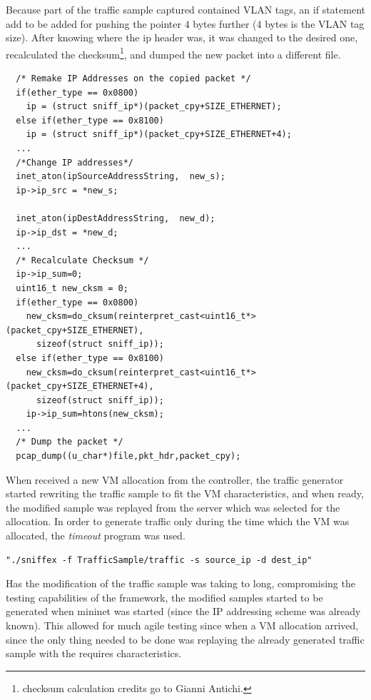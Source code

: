 \documentclass[12pt,english,oneside]{book}
\begin{document}
Because part of the traffic sample captured contained VLAN tags, an if statement add to be added for pushing the pointer $4$ bytes further ($4$ bytes is the VLAN tag size).
After knowing where the ip header was, it was changed to the desired one, recalculated the checksum\footnote{checksum calculation credits go to Gianni Antichi.}, and dumped the new packet into a different file.

\begin{lstlisting}
  /* Remake IP Addresses on the copied packet */
  if(ether_type == 0x0800)
    ip = (struct sniff_ip*)(packet_cpy+SIZE_ETHERNET);
  else if(ether_type == 0x8100)
    ip = (struct sniff_ip*)(packet_cpy+SIZE_ETHERNET+4);
  ...
  /*Change IP addresses*/
  inet_aton(ipSourceAddressString,  new_s);
  ip->ip_src = *new_s;
  
  inet_aton(ipDestAddressString,  new_d);
  ip->ip_dst = *new_d;
  ...
  /* Recalculate Checksum */
  ip->ip_sum=0;
  uint16_t new_cksm = 0;
  if(ether_type == 0x0800)
    new_cksm=do_cksum(reinterpret_cast<uint16_t*>(packet_cpy+SIZE_ETHERNET),
      sizeof(struct sniff_ip));
  else if(ether_type == 0x8100)
    new_cksm=do_cksum(reinterpret_cast<uint16_t*>(packet_cpy+SIZE_ETHERNET+4),
      sizeof(struct sniff_ip));
    ip->ip_sum=htons(new_cksm);
  ...
  /* Dump the packet */    
  pcap_dump((u_char*)file,pkt_hdr,packet_cpy);

\end{lstlisting}

When received a new VM allocation from the controller, the traffic generator started rewriting the traffic sample to fit the VM characteristics, and when ready, the modified sample was replayed from the server which was selected for the allocation. In order to generate traffic only during the time which the VM was allocated, the \textit{timeout} program was used.

\begin{verbatim}
"./sniffex -f TrafficSample/traffic -s source_ip -d dest_ip"
\end{verbatim}

Has the modification of the traffic sample was taking to long, compromising the testing capabilities of the framework, the modified samples started to be generated when mininet was started (since the IP addressing scheme was already known). This allowed for much agile testing since when a VM allocation arrived, since the only thing needed to be done was replaying the already generated traffic sample with the requires characteristics.
\end{document}

